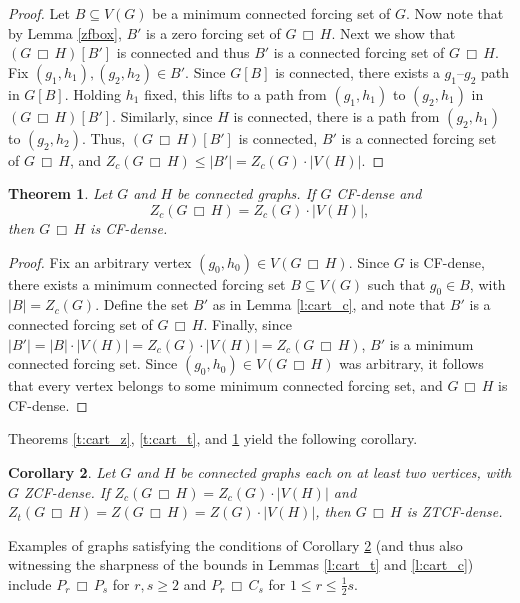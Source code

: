 \documentclass[11pt]{article}
\newtheorem{thm}{Theorem}
\newtheorem{cor}[thm]{Corollary}
\theoremstyle{definition}
\newcommand{\cprod}{\,\Box\,}
\newcommand{\1}{\vspace{0.1cm}}
\newcommand{\2}{\vspace{0.2cm}}
\newcommand{\3}{\vspace{0.3cm}}
\begin{document}
\begin{proof}
Let $B \subseteq V(G)$ be a minimum connected forcing set of $G$.  Now note that by Lemma \ref{zfbox}, $B'$ is a zero forcing set of $G \cprod H$.  Next we show that $(G \cprod H)[B']$ is connected and thus $B'$ is a connected forcing set of $G \cprod H$.  Fix $ (g_1, h_1), (g_2, h_2) \in B' $. Since $ G[B] $ is connected, there exists a $ g_1 $--$ g_2 $ path in $ G[B] $. Holding $ h_1 $ fixed, this lifts to a path from $ (g_1, h_1) $ to $ (g_2, h_1) $ in $ (G \cprod H)[B'] $. Similarly, since $ H $ is connected, there is a path from $ (g_2, h_1) $ to $ (g_2, h_2) $. Thus, $ (G \cprod H)[B'] $ is connected, $B'$ is a connected forcing set of $G \cprod H$, and $Z_c(G \cprod  H) \leq |B'|=Z_c(G)\cdot |V(H)|$.
\end{proof}

\begin{thm}\label{t:cart_c-alt}
Let $ G $ and $ H $ be connected graphs. If $ G $ CF-dense and 
\[
Z_c(G \cprod H) = Z_c(G) \cdot |V(H)|,
\]
then $ G \cprod H $ is CF-dense.
\end{thm}

\begin{proof}
Fix an arbitrary vertex $ (g_0, h_0) \in V(G \cprod H) $. Since $ G $ is CF-dense, there exists a minimum connected forcing set $ B \subseteq V(G) $ such that $ g_0 \in B $, with $ |B| = Z_c(G) $. Define the set $B'$ as in Lemma \ref{l:cart_c}, and note that $B'$ is a connected forcing set of $G \cprod H$.  Finally, since $ |B'| = |B| \cdot |V(H)| = Z_c(G) \cdot |V(H)| = Z_c(G \cprod H) $, $ B' $ is a minimum connected forcing set. Since $ (g_0, h_0) \in V(G \cprod H) $ was arbitrary, it follows that every vertex belongs to some minimum connected forcing set, and $ G \cprod H $ is CF-dense.
\end{proof}

Theorems \ref{t:cart_z}, \ref{t:cart_t}, and \ref{t:cart_c-alt}  yield the following corollary.

\begin{cor}\label{c:cart}
Let $G$ and $H$ be connected graphs each on at least two vertices, with $G$ ZCF-dense.  If $Z_c(G \cprod H)=Z_c(G)\cdot|V(H)|$ and $Z_t(G \cprod  H)=Z(G \cprod H)=Z(G)\cdot|V(H)|$, then $G \cprod H$ is ZTCF-dense.
\end{cor}

Examples of graphs satisfying the conditions of Corollary \ref{c:cart} (and thus also witnessing the sharpness of the bounds in Lemmas \ref{l:cart_t} and \ref{l:cart_c}) include $P_r \cprod P_s$ for $r,s \geq 2$ and $P_r \cprod C_s$ for $1 \leq r \leq \frac{1}{2}s$.  
\end{document}
